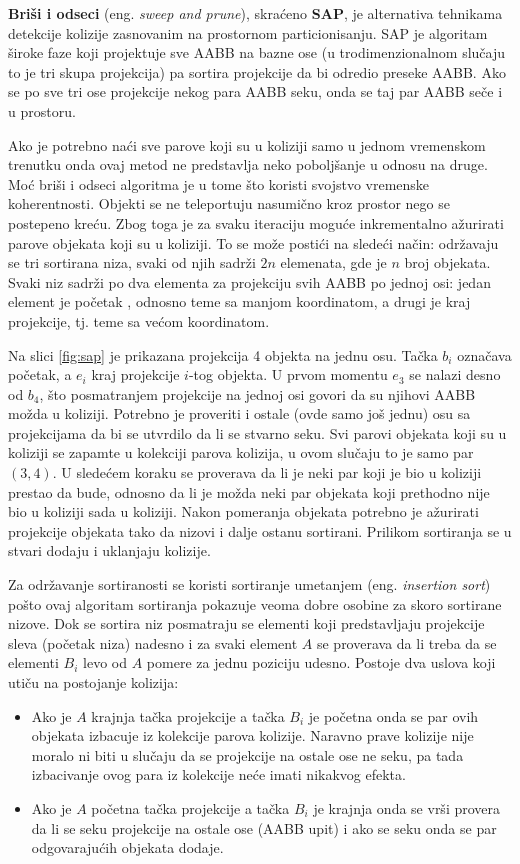 \documentclass[12pt,oneside]{memoir}
\begin{document}
\textbf{Briši i odseci} (eng. {\em sweep and prune}), skraćeno \textbf{SAP}, je alternativa tehnikama detekcije kolizije 
zasnovanim na prostornom particionisanju.
SAP je algoritam široke faze koji projektuje sve AABB
na bazne ose (u trodimenzionalnom slučaju to je tri skupa projekcija) pa sortira projekcije da bi odredio preseke AABB.
Ako se po sve tri ose projekcije nekog para AABB seku, onda se taj par AABB seče i u prostoru.

Ako je potrebno naći sve parove koji su u koliziji samo u jednom vremenskom trenutku onda ovaj metod ne predstavlja neko poboljšanje u odnosu na druge.
Moć briši i odseci algoritma je u tome što koristi svojstvo vremenske koherentnosti.
Objekti se ne teleportuju nasumično kroz prostor nego se postepeno kreću. 
Zbog toga je za svaku iteraciju moguće inkrementalno ažurirati parove objekata koji su u koliziji.
To se može postići na sledeći način: održavaju se tri sortirana niza, svaki od njih sadrži $2n$ elemenata, gde je $n$ broj objekata.
Svaki niz sadrži po dva elementa za projekciju svih AABB po jednoj osi: jedan element je početak 
, odnosno teme sa manjom koordinatom, a drugi je kraj projekcije, tj. teme sa većom koordinatom. 

Na slici \ref{fig:sap} je prikazana projekcija 4 objekta na jednu osu. 
Tačka $b_i$ označava početak, a $e_i$ kraj projekcije $i$-tog objekta.
U prvom momentu $e_3$ se nalazi desno od $b_4$, što posmatranjem projekcije na jednoj osi govori da su njihovi AABB možda u koliziji.
Potrebno je proveriti i ostale (ovde samo još jednu) osu sa projekcijama da bi se utvrdilo da li se stvarno seku.
Svi parovi objekata koji su u koliziji se zapamte u kolekciji parova kolizija, u ovom slučaju to je samo par $(3, 4)$.
U sledećem koraku se proverava da li je neki par koji je bio u koliziji prestao da bude, 
odnosno da li je možda neki par objekata koji prethodno nije bio u koliziji sada u koliziji.
Nakon pomeranja objekata potrebno je ažurirati projekcije objekata tako da nizovi i dalje ostanu sortirani.
Prilikom sortiranja se u stvari dodaju i uklanjaju kolizije.

Za održavanje sortiranosti se koristi sortiranje umetanjem (eng. {\em insertion sort}) 
pošto ovaj algoritam sortiranja pokazuje veoma dobre osobine za skoro sortirane nizove.
Dok se sortira niz posmatraju se elementi koji predstavljaju projekcije sleva (početak niza) nadesno i za svaki element $A$ se proverava da li treba da se elementi $B_i$ levo od $A$
pomere za jednu poziciju udesno. Postoje dva uslova koji utiču na postojanje kolizija:
\begin{itemize}  
	\item Ako je $A$ krajnja tačka projekcije a tačka $B_i$ je početna onda se par ovih objekata izbacuje iz kolekcije parova kolizije.
	Naravno prave kolizije nije moralo ni biti u slučaju da se projekcije na ostale ose ne seku, 
	pa tada izbacivanje ovog para iz kolekcije neće imati nikakvog efekta.
	\item Ako je $A$ početna tačka projekcije a tačka $B_i$ je krajnja onda se vrši provera da li se seku projekcije na ostale ose (AABB upit) i ako se seku
	onda se par odgovarajućih objekata dodaje.

\end{itemize}  
\end{document}
